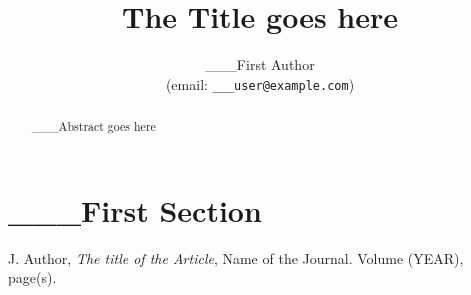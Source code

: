\documentclass[a4paper,12pt]{report}
\title{The Title goes here}
\author{
	___First Author\\
	(email: {\tt ___user@example.com}) \\
}
\begin{document}
\maketitle

\begin{abstract}
___Abstract goes here
\end{abstract}

\tableofcontents
\newpage
\listoffigures
\newpage

\section{___First Section}



\begin{thebibliography}{99}
J. Author, {\em The title of the Article}, Name of the Journal. Volume 
 (YEAR), page(s).                                           
         

\end{thebibliography}
\end{document}

